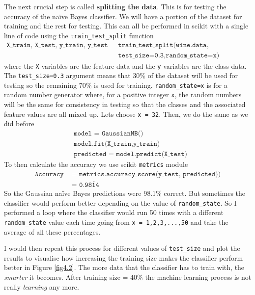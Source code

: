 \documentclass[12pt,twoside]{report}   %
\newcommand{\bb}{\textbf}
\newcommand{\ti}{\textit}
\begin{document}
The next crucial step is called \bb{splitting the data}. This is for testing the accuracy of the na\"{i}ve Bayes classifier. We will have a portion of the dataset for training and the rest for testing. This can all be performed in scikit with a single line of code using the \colorbox{codegrey}{\texttt{train\_test\_split}} function
\begin{align*}
\texttt{X\_train, X\_test, y\_train, y\_test = }&\texttt{train\_test\_split(wine.data, wine.target,}\\
&\texttt{test\_size=0.3,random\_state=x)}
\end{align*}
where the \colorbox{codegrey}{\texttt{X}} variables are the feature data and the \colorbox{codegrey}{\texttt{y}} variables are the class data. The \colorbox{codegrey}{\texttt{test\_size=0.3}} argument means that 30\% of the dataset will be used for testing so the remaining 70\% is used for training. \colorbox{codegrey}{\texttt{random\_state=x}} is for a random number generator where, for a positive integer \colorbox{codegrey}{\texttt{x}}, the random numbers will be the same for consistency in testing so that the classes and the associated feature values are all mixed up. Lets choose \colorbox{codegrey}{\texttt{x = 32}}. Then, we do the same as we did before
\begin{align*}
&\texttt{model = GaussianNB()}\\
&\texttt{model.fit(X\_train,y\_train)}\\
&\texttt{predicted = model.predict(X\_test)}
\end{align*}
To then calculate the accuracy we use scikit \colorbox{codegrey}{\texttt{metrics}} module
\begin{align*}
\texttt{Accuracy }&\texttt{= metrics.accuracy\_score(y\_test, predicted))}\\
&\texttt{= 0.9$\overline{\texttt{814}}$}
\end{align*}
So the Gaussian na\"{i}ve Bayes predictions were 98.1\% correct. But sometimes the classifier would perform better depending on the value of \colorbox{codegrey}{\texttt{random\_state}}. So I performed a loop where the classifier would run 50 times with a different \colorbox{codegrey}{\texttt{random\_state}} value each time going from \colorbox{codegrey}{\texttt{x = 1,2,3,...,50}} and take the average of all these percentages. 

I would then repeat this process for different values of \colorbox{codegrey}{\texttt{test\_size}} and plot the results to visualise how increasing the training size makes the classifier perform better in Figure \ref{fig4.2}. The more data that the classifier has to train with, the \ti{smarter} it becomes. After training size = 40\% the machine learning process is not really \ti{learning} any more.
\end{document}
